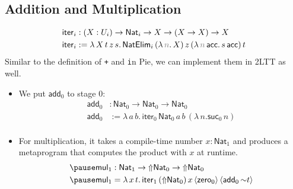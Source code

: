 \documentclass[handout]{beamer}
\newenvironment{fr}[1][]
{\begin{frame}[fragile,environment=fr,#1]}
{\end{frame}}
\begin{document}
\subsection{Addition and Multiplication}
\begin{fr}{\subsecname}
$$
\begin{aligned}
    \mathsf{iter}_i&:(X:U_i)\to\mathsf{Nat}_i\to X\to (X\to X)\to X\\
    \mathsf{iter}_i&:=\lambda\,X\,t\,z\,s.\,\mathsf{NatElim}_i\,(\lambda\,\gray n.\,X)\,z\,(\lambda\,\gray n\,\mathsf{acc}.\,s\,\mathsf{acc})\,t\\
\end{aligned}
$$
\pause
Similar to the definition of \texttt+ and \texttt* in Pie, we can implement them in 2LTT as well.

\begin{itemize}
    \item\pause We put $\mathsf{add}_0$ to stage $0$:
    $$
    \begin{aligned}
        \mathsf{add}_0&:\mathsf{Nat}_0\to\mathsf{Nat}_0\to\mathsf{Nat}_0\\
        \mathsf{add}_0&:=\lambda\,a\,b.\,\mathsf{iter}_0\,\mathsf{Nat}_0\,a\,b\,(\lambda\,n.\mathsf{suc}_0\,n)\\
    \end{aligned}
    $$
    \item \pause For multiplication, it takes a compile-time number $x:\mathsf{Nat}_1$ and produces a metaprogram that computes the product with $x$ at runtime.
    $$
    \begin{aligned}
        \pause\mathsf{mul}_1&:\mathsf{Nat}_1\to{\Uparrow}\mathsf{Nat}_0\to{\Uparrow}\mathsf{Nat}_0\\
        \pause\mathsf{mul}_1&=\lambda\,x\,t.\,\mathsf{iter}_1\,({\Uparrow}\mathsf{Nat}_0)\,x\,\langle\mathsf{zero}_0\rangle\,\langle \mathsf{add}_0\,{\sim}t\rangle\\
    \end{aligned}
    $$
\end{itemize}
\end{fr}
\end{document}
